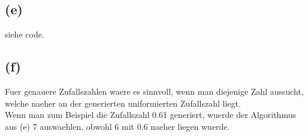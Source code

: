 \documentclass[a4paper]{scrartcl}
\begin{document}
\subsection*{(e)}
siehe code.
\subsection*{(f)} %
Fuer genauere Zufallszahlen waere es sinnvoll, wenn man diejenige Zahl aussucht, welche naeher an der generierten uniformierten Zufallszahl liegt. \\
Wenn man zum Beispiel die Zufallszahl 0.61 generiert, wuerde der Algorithmus aus (e) 7 auswaehlen, obwohl 6 mit 0.6 naeher liegen wuerde. 
\end{document}
